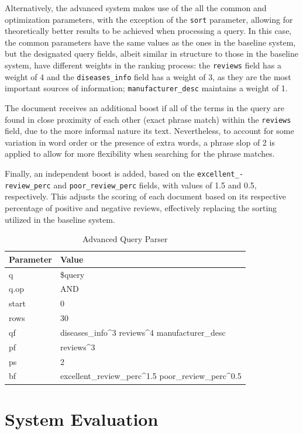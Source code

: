 \documentclass[sigconf]{acmart}
\begin{document}
Alternatively, the advanced system makes use of the all the common and optimization parameters, with the exception of the \texttt{sort} parameter, allowing for theoretically better results to be achieved when processing a query. In this case, the common parameters have the same values as the ones in the baseline system, but the designated query fields, albeit similar in structure to those in the baseline system, have different weights in the ranking process: the \texttt{reviews} field has a weight of 4 and the \texttt{diseases\_info} field has a weight of 3, as they are the most important sources of information; \texttt{manufacturer\_desc} maintains a weight of 1. 

The document receives an additional boost if all of the terms in the query are found in close proximity of each other (exact phrase match) within the \texttt{reviews} field, due to the more informal nature its text. Nevertheless, to account for some variation in word order or the presence of extra words, a phrase slop of 2 is applied to allow for more flexibility when searching for the phrase matches.

Finally, an independent boost is added, based on the \texttt{excellent\_-\\review\_perc} and \texttt{poor\_review\_perc} fields, with values of 1.5 and 0.5, respectively. This adjusts the scoring of each document based on its respective percentage of positive and negative reviews, effectively replacing the sorting utilized in the baseline system.

\begin{table}[H]
    \begin{tabular}{ll}
    \toprule
    Parameter & Value\\
    \midrule
    q & \$query\\
    q.op & AND\\
    start & 0\\
    rows & 30\\
    qf & diseases\_info\^{}3 reviews\^{}4 manufacturer\_desc\\
    pf & reviews\^{}3\\
    ps & 2\\
    bf & excellent\_review\_perc\^{}1.5 poor\_review\_perc\^{}0.5\\
    \bottomrule
    \end{tabular}
    \caption{Advanced Query Parser}
    \label{tab:advanced_query}
\end{table}

\section{System Evaluation}
\end{document}

